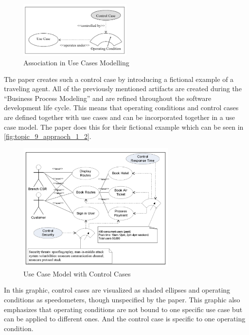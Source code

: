 \begin{figure}[htbp]
	\centering
	\includegraphics[width=0.5\textwidth]{../images/topic_9_approach_1_1.png}
	\caption{Association in Use Cases Modelling~\cite{ZouPavlovski2008}}
	\label{fig:topic_9_appraoch_1_use_case}
\end{figure}

The paper creates such a control case by introducing a fictional example of a traveling agent.
All of the previously mentioned artifacts are created during the \enquote{Business Process Modeling} and are refined throughout the software development life cycle.
This means that operating conditions and control cases are defined together with use cases and can be incorporated together in a use case model.
The paper does this for their fictional example which can be seen in \autoref{fig:topic_9_appraoch_1_2}. 

\begin{figure}[h!]
	\centering
	\includegraphics[width=0.7\textwidth]{../images/topic_9_approach_1_2.png}
	\caption{Use Case Model with Control Cases~\cite{ZouPavlovski2008}}
	\label{fig:topic_9_appraoch_1_2}
\end{figure}

In this graphic, control cases are visualized as shaded ellipses and operating conditions as speedometers, though unspecified by the paper. 
This graphic also emphasizes that operating conditions are not bound to one specific use case but can be applied to different ones.
And the control case is specific to one operating condition.


